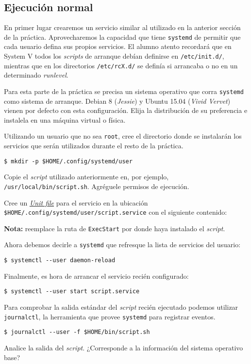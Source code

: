 \subsection{Ejecución normal}
En primer lugar crearemos un servicio similar al utilizado en la anterior
sección de la práctica. Aprovecharemos la capacidad que tiene
\texttt{systemd} de permitir que cada usuario defina sus propios
servicios. El alumno atento recordará que en System V todos los
\textit{scripts} de arranque debían definirse en \texttt{/etc/init.d/},
mientras que en los directorios \texttt{/etc/rcX.d/} se definía si
arrancaba o no en un determinado \textit{runlevel}.
\begin{questions}
  \question Para esta parte de la práctica se precisa un sistema operativo
  que corra \texttt{systemd} como sistema de arranque. Debian 8
  (\textit{Jessie}) y Ubuntu 15.04 (\textit{Vivid Vervet}) vienen por
  defecto con esta configuración. Elija la distribución de su preferencia e
  instalela en una máquina virtual o física.

  \question Utilizando un usuario que no sea \texttt{root}, cree el
  directorio donde se instalarán los servicios que serán utilizados durante
  el resto de la práctica.
\begin{verbatim}
$ mkdir -p $HOME/.config/systemd/user
\end{verbatim}

  \question Copie el \textit{script} utilizado anteriormente en, por
  ejemplo, \texttt{/usr/local/bin/script.sh}. Agréguele permisos de
  ejecución.

  \question Cree un
  \textit{\href{http://0pointer.de/public/systemd-man/systemd.unit.html}{Unit
      file}} para el servicio en la ubicación
  \texttt{\$HOME/.config/systemd/user/script.service} con el siguiente
  contenido: 

  \textbf{Nota:} reemplace la ruta de \texttt{ExecStart} por donde haya
  instalado el \textit{script}. %
  
  \question Ahora debemos decirle a \texttt{systemd} que refresque la lista
  de servicios del usuario:
\begin{verbatim}
$ systemctl --user daemon-reload
\end{verbatim}

    \question Finalmente, es hora de arrancar el servicio recién configurado:
\begin{verbatim}
$ systemctl --user start script.service
\end{verbatim}

    \question Para comprobar la salida estándar del \textit{script} recién
    ejecutado podemos utilizar \texttt{journalctl}, la herramienta que
    provee \texttt{systemd} para registrar eventos.
\begin{verbatim}
$ journalctl --user -f $HOME/bin/script.sh
\end{verbatim}

    Analice la salida del \textit{script}. ¿Corresponde a la información
    del sistema operativo base?   

\end{questions}

